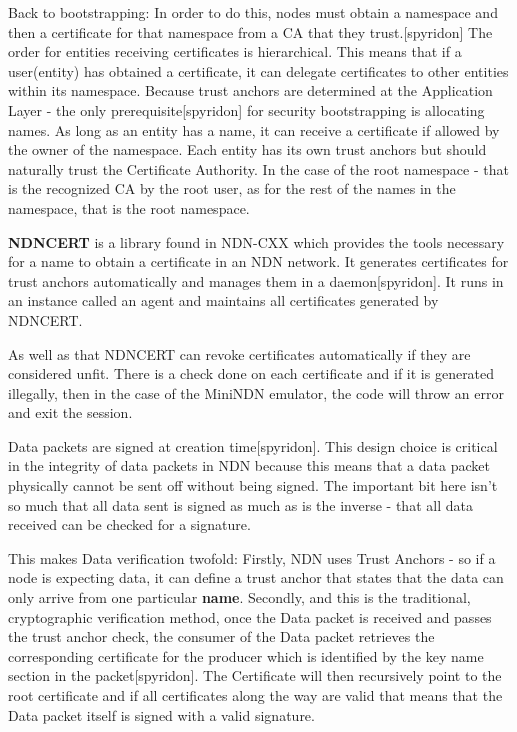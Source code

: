   Back to bootstrapping: In order to do this, nodes must obtain a namespace and then a certificate for that namespace from a CA that they trust.[spyridon] The order for entities receiving certificates is hierarchical. This means that if a user(entity) has obtained a certificate, it can delegate certificates to other entities within its namespace.
 Because trust anchors are determined at the Application Layer - the only prerequisite[spyridon] for security bootstrapping is allocating names. As long as an entity has a name, it can receive a certificate if allowed by the owner of the namespace. 
 Each entity has its own trust anchors but should naturally trust the Certificate Authority. In the case of the root namespace - that is the recognized CA by the root user, as for the rest of the names in the namespace, that is the root namespace.\par
 \textbf{NDNCERT} is a library found in NDN-CXX which provides the tools necessary for a name to obtain a certificate in an NDN network. It generates certificates for trust anchors automatically and manages them in a daemon[spyridon]. It runs in an instance called an agent and maintains all certificates generated by NDNCERT.\par
As well as that NDNCERT can revoke certificates automatically if they are considered unfit. There is a check done on each certificate and if it is generated illegally, then in the case of the MiniNDN emulator, the code will throw an error and exit the session.\par
Data packets are signed at creation time[spyridon]. This design choice is critical in the integrity of data packets in NDN because this means that a data packet physically cannot be sent off without being signed. The important bit here isn't so much that all data sent is signed as much as is the inverse - that all data received can be checked for a signature. 

This makes Data verification twofold: Firstly, NDN uses Trust Anchors - so if a node is expecting data, it can define a trust anchor that states that the data can only arrive from one particular \textbf{name}. Secondly, and this is the traditional, cryptographic verification method, once the Data packet is received and passes the trust anchor check, the consumer of the Data packet retrieves the corresponding certificate for the producer which is identified by the key name section in the packet[spyridon]. The Certificate will then recursively point to the root certificate and if all certificates along the way are valid that means that the Data packet itself is signed with a valid signature.

